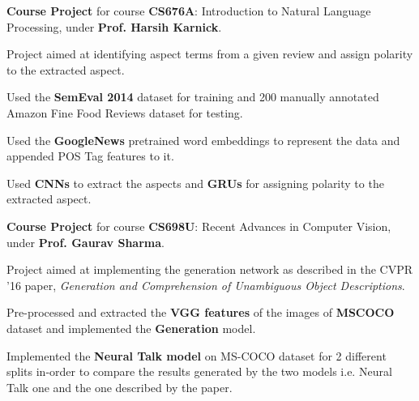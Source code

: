 \documentclass[a4paper]{norm-resume}
\begin{document}
				
	\vspace{0.45mm}
	\begin{tightitemize}
	\small
	{
	\item \textbf{Course Project} for course \textbf{CS676A}: Introduction to Natural Language Processing, under \textbf{Prof. Harsih Karnick}.
    \item Project aimed at identifying aspect terms from a given review and assign polarity to the extracted aspect.
    \item Used the \textbf{SemEval 2014} dataset for training and 200 manually annotated Amazon Fine Food Reviews dataset for testing.
    \item Used the \textbf{GoogleNews} pretrained word embeddings to represent the data and appended POS Tag features to it.
    \item Used \textbf{CNNs} to extract the aspects and \textbf{GRUs} for assigning polarity to the extracted aspect.
	}
	\end{tightitemize}
		
	\pagebreak
	
				\duration{Aug '16 - Nov '16}
	\vspace{0.45mm}
	\begin{tightitemize}
	\small
	{
	\item \textbf{Course Project} for course \textbf{CS698U}: Recent Advances in Computer Vision, under \textbf{Prof. Gaurav Sharma}.
    \item Project aimed at implementing the generation network as described in the CVPR '16 paper, \textit{Generation and Comprehension of Unambiguous Object Descriptions}.
    \item Pre-processed and extracted the \textbf{VGG features} of the images of \textbf{MSCOCO} dataset and implemented the \textbf{Generation} model.
    \item Implemented the \textbf{Neural Talk model} on MS-COCO dataset for 2 different splits in-order to compare the results generated by the two models i.e. Neural Talk one and the one described by the paper.
	}
	\end{tightitemize}
		
\end{document}
